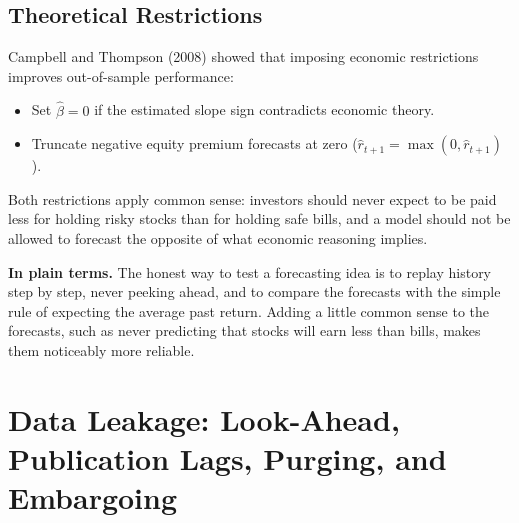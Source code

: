 \subsection{Theoretical Restrictions}
Campbell and Thompson (2008) showed that imposing economic restrictions improves out-of-sample performance:
\begin{itemize}
  \item Set $\hat{\beta} = 0$ if the estimated slope sign contradicts economic theory.
  \item Truncate negative equity premium forecasts at zero ($\hat{r}_{t+1} = \max(0, \hat{r}_{t+1})$).
\end{itemize}
Both restrictions apply common sense: investors should never expect to be paid less for holding risky stocks than for holding safe bills, and a model should not be allowed to forecast the opposite of what economic reasoning implies.

\noindent\textbf{In plain terms.} The honest way to test a forecasting idea is to replay history step by step, never peeking ahead, and to compare the forecasts with the simple rule of expecting the average past return. Adding a little common sense to the forecasts, such as never predicting that stocks will earn less than bills, makes them noticeably more reliable.

\section{Data Leakage: Look-Ahead, Publication Lags, Purging, and Embargoing}
\label{sec:09-leakage}

